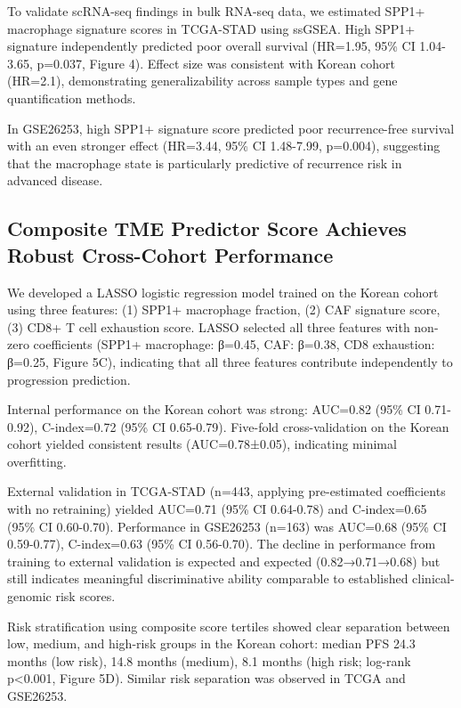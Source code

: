 \documentclass[12pt,twoside]{article}
\begin{document}
To validate scRNA-seq findings in bulk RNA-seq data, we estimated SPP1+ macrophage signature scores in TCGA-STAD using ssGSEA. High SPP1+ signature independently predicted poor overall survival (HR=1.95, 95\% CI 1.04-3.65, p=0.037, Figure 4). Effect size was consistent with Korean cohort (HR=2.1), demonstrating generalizability across sample types and gene quantification methods.

In GSE26253, high SPP1+ signature score predicted poor recurrence-free survival with an even stronger effect (HR=3.44, 95\% CI 1.48-7.99, p=0.004), suggesting that the macrophage state is particularly predictive of recurrence risk in advanced disease.

\subsection{Composite TME Predictor Score Achieves Robust Cross-Cohort Performance}

We developed a LASSO logistic regression model trained on the Korean cohort using three features: (1) SPP1+ macrophage fraction, (2) CAF signature score, (3) CD8+ T cell exhaustion score. LASSO selected all three features with non-zero coefficients (SPP1+ macrophage: β=0.45, CAF: β=0.38, CD8 exhaustion: β=0.25, Figure 5C), indicating that all three features contribute independently to progression prediction.

Internal performance on the Korean cohort was strong: AUC=0.82 (95\% CI 0.71-0.92), C-index=0.72 (95\% CI 0.65-0.79). Five-fold cross-validation on the Korean cohort yielded consistent results (AUC=0.78±0.05), indicating minimal overfitting.

External validation in TCGA-STAD (n=443, applying pre-estimated coefficients with no retraining) yielded AUC=0.71 (95\% CI 0.64-0.78) and C-index=0.65 (95\% CI 0.60-0.70). Performance in GSE26253 (n=163) was AUC=0.68 (95\% CI 0.59-0.77), C-index=0.63 (95\% CI 0.56-0.70). The decline in performance from training to external validation is expected and expected (0.82→0.71→0.68) but still indicates meaningful discriminative ability comparable to established clinical-genomic risk scores.

Risk stratification using composite score tertiles showed clear separation between low, medium, and high-risk groups in the Korean cohort: median PFS 24.3 months (low risk), 14.8 months (medium), 8.1 months (high risk; log-rank p<0.001, Figure 5D). Similar risk separation was observed in TCGA and GSE26253.
\end{document}
